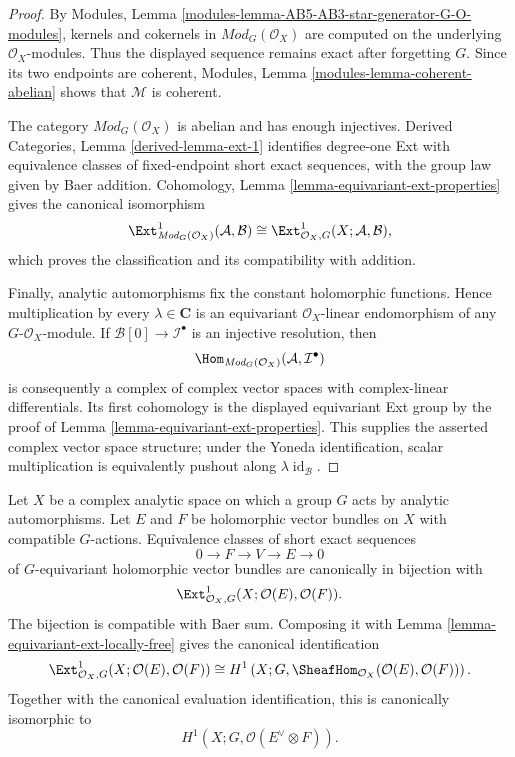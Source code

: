 \begin{proof}
By Modules, Lemma
\ref{modules-lemma-AB5-AB3-star-generator-G-O-modules}, kernels and cokernels
in $\textit{Mod}_G(\mathcal O_X)$ are computed on the underlying
$\mathcal O_X$-modules. Thus the displayed sequence remains exact after
forgetting $G$. Since its two endpoints are coherent, Modules, Lemma
\ref{modules-lemma-coherent-abelian} shows that $\mathcal M$ is coherent.

The category $\textit{Mod}_G(\mathcal O_X)$ is abelian and has enough
injectives. Derived Categories, Lemma \ref{derived-lemma-ext-1} identifies
degree-one Ext with equivalence classes of fixed-endpoint short exact
sequences, with the group law given by Baer addition. Cohomology, Lemma
\ref{lemma-equivariant-ext-properties} gives the canonical isomorphism
$$
\Ext^1_{\textit{Mod}_G(\mathcal O_X)}(\mathcal A,\mathcal B)
\cong
\Ext^1_{\mathcal O_X,G}(X;\mathcal A,\mathcal B),
$$
which proves the classification and its compatibility with addition.

Finally, analytic automorphisms fix the constant holomorphic functions. Hence
multiplication by every $\lambda\in\mathbf C$ is an equivariant
$\mathcal O_X$-linear endomorphism of any $G$-$\mathcal O_X$-module. If
$\mathcal B[0]\to\mathcal I^\bullet$ is an injective resolution, then
$$
\Hom_{\textit{Mod}_G(\mathcal O_X)}
(\mathcal A,\mathcal I^\bullet)
$$
is consequently a complex of complex vector spaces with complex-linear
differentials. Its first cohomology is the displayed equivariant Ext group by
the proof of Lemma \ref{lemma-equivariant-ext-properties}. This supplies the
asserted complex vector space structure; under the Yoneda identification,
scalar multiplication is equivalently pushout along
$\lambda\operatorname{id}_{\mathcal B}$.
\end{proof}

\begin{lemma}
\label{lemma-equivariant-holomorphic-vector-bundle-extension-classes}
\begin{reference}
\cite[Chapter V, \S 5.6, p. 219]{Tohoku}
\end{reference}
Let $X$ be a complex analytic space on which a group $G$ acts by analytic
automorphisms. Let $E$ and $F$ be holomorphic vector bundles on $X$ with
compatible $G$-actions. Equivalence classes of short exact sequences
$$
0 \longrightarrow F \longrightarrow V \longrightarrow E \longrightarrow 0
$$
of $G$-equivariant holomorphic vector bundles are canonically in bijection
with
$$
\Ext^1_{\mathcal O_X,G}
(X;\mathcal O(E),\mathcal O(F)).
$$
The bijection is compatible with Baer sum. Composing it with Lemma
\ref{lemma-equivariant-ext-locally-free} gives the canonical identification
$$
\Ext^1_{\mathcal O_X,G}
(X;\mathcal O(E),\mathcal O(F))
\cong
H^1\left(X;G,
\SheafHom_{\mathcal O_X}(\mathcal O(E),\mathcal O(F))\right).
$$
Together with the canonical evaluation identification, this is canonically
isomorphic to
$$
H^1\left(X;G,\mathcal O(E^\vee\otimes F)\right).
$$
\end{lemma}

